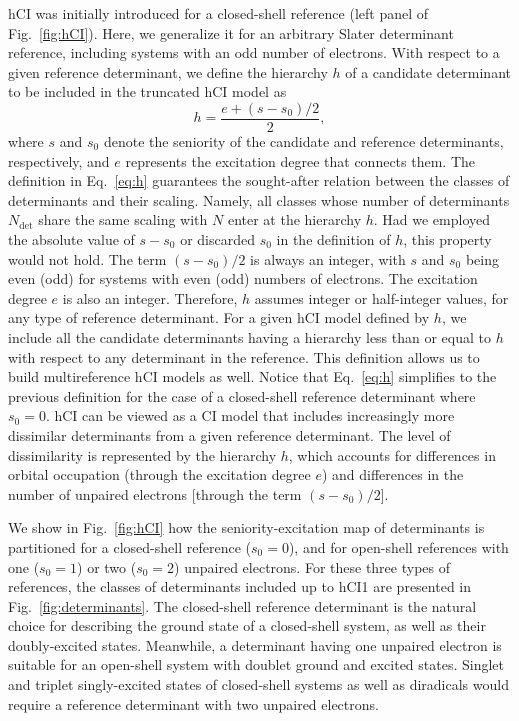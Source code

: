 \documentclass[aip,jcp,reprint,noshowkeys,superscriptaddress]{revtex4-1}
\newcommand{\Ndet}{N_\text{det}}
\begin{document}
hCI was initially introduced for a closed-shell reference (left panel of Fig.~\ref{fig:hCI}). \cite{Kossoski_2022}
Here, we generalize it for an arbitrary Slater determinant reference, including systems with an odd number of electrons.
With respect to a given reference determinant, we define the hierarchy $h$ of a candidate determinant to be included in the truncated hCI model as
\begin{equation}
  \label{eq:h}
  h = \frac{e+ (s-s_0)/2}{2},
\end{equation}
where $s$ and $s_0$ denote the seniority of the candidate and reference determinants, respectively, and $e$ represents the excitation degree that connects them.
The definition in Eq.~\eqref{eq:h} guarantees the sought-after relation between the classes of determinants and their scaling.
Namely, all classes whose number of determinants $\Ndet$ share the same scaling with $N$ enter at the hierarchy $h$.
Had we employed the absolute value of $s-s_0$ or discarded $s_0$ in the definition of $h$, this property would not hold.
The term $(s-s_0)/2$ is always an integer, with $s$ and $s_0$ being even (odd) for systems with even (odd) numbers of electrons. The excitation degree $e$ is also an integer.
Therefore, $h$ assumes integer or half-integer values, for any type of reference determinant.
For a given hCI model defined by $h$, we include all the candidate determinants having a hierarchy less than or equal to $h$ with respect to any determinant in the reference.
This definition allows us to build multireference hCI models as well.
Notice that Eq.~\eqref{eq:h} simplifies to the previous definition \cite{Kossoski_2022} for the case of a closed-shell reference determinant where $s_0 = 0$.
hCI can be viewed as a CI model that includes increasingly more dissimilar determinants from a given reference determinant.
The level of dissimilarity is represented by the hierarchy $h$, which accounts for differences in orbital occupation (through the excitation degree $e$)
and differences in the number of unpaired electrons [through the term $(s-s_0)/2$].

We show in Fig.~\ref{fig:hCI} how the seniority-excitation map of determinants is partitioned for a closed-shell reference ($s_0 = 0$), and for open-shell references with one ($s_0 = 1$) or two ($s_0 = 2$) unpaired electrons.
For these three types of references, the classes of determinants included up to hCI1 are presented in Fig.~\ref{fig:determinants}.
The closed-shell reference determinant is the natural choice for describing the ground state of a closed-shell system, as well as their doubly-excited states. \cite{Barca_2018,Lee_2019,Hait_2020,Kossoski_2021,Marie_2021,Kossoski_2023}
Meanwhile, a determinant having one unpaired electron is suitable for an open-shell system with doublet ground and excited states.
Singlet and triplet singly-excited states of closed-shell systems as well as diradicals \cite{Krylov_2006,Horbatenko_2021,Monino_2022} would require
a reference determinant with two unpaired electrons.
\end{document}
